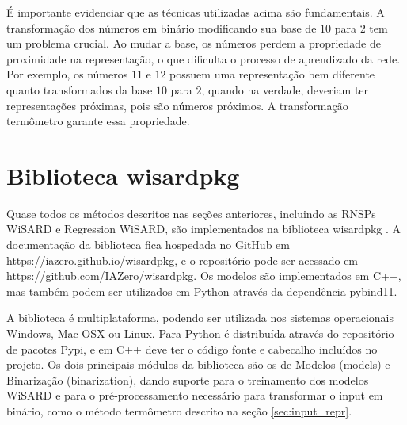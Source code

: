 É importante evidenciar que as técnicas utilizadas acima são fundamentais. A transformação dos números em binário modificando sua base de $10$ para $2$ tem um problema crucial. Ao mudar a base, os números perdem a propriedade de proximidade na representação, o que dificulta o processo de aprendizado da rede. Por exemplo, os números $11$ e $12$ possuem uma representação bem diferente quanto transformados da base $10$ para $2$, quando na verdade, deveriam ter representações próximas, pois são números próximos. A transformação termômetro garante essa propriedade.

\section{Biblioteca wisardpkg} \label{sec:wisardpkg}
Quase todos os métodos descritos nas seções anteriores, incluindo as RNSPs WiSARD e Regression WiSARD, são implementados na biblioteca wisardpkg \cite{wisardpkg}. A documentação da biblioteca fica hospedada no GitHub em \url{https://iazero.github.io/wisardpkg}, e o repositório pode ser acessado em \url{https://github.com/IAZero/wisardpkg}. Os modelos são implementados em C++, mas também podem ser utilizados em Python através da dependência pybind11.

A biblioteca é multiplataforma, podendo ser utilizada nos sistemas operacionais Windows, Mac OSX ou Linux. Para Python é distribuída através do repositório de pacotes Pypi, e em C++ deve ter o código fonte e cabecalho incluídos no projeto. Os dois principais módulos da biblioteca são os de Modelos (models) e Binarização (binarization), dando suporte para o treinamento dos modelos WiSARD e para o pré-processamento necessário para transformar o input em binário, como o método termômetro descrito na seção \ref{sec:input_repr}.